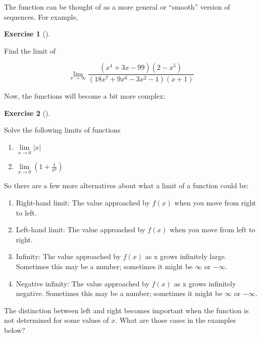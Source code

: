 \documentclass[
  letterpaper,
]{book}
\providecommand{\tightlist}{%
  \setlength{\itemsep}{0pt}\setlength{\parskip}{0pt}}\usepackage{longtable,booktabs,array}
\theoremstyle{definition}
\theoremstyle{definition}
\theoremstyle{plain}
\theoremstyle{definition}
\newtheorem{exercise}{Exercise}[chapter]
\theoremstyle{plain}
\theoremstyle{plain}
\theoremstyle{remark}
\begin{document}
The function can be thought of as a more general or ``smooth'' version
of sequences. For example,

\leavevmode{}%
\begin{exercise}[]\label{exr-limfunmax}

Find the limit of

\[\lim_{x\to\infty} \frac{(x^4 +3x−99)(2−x^5)}{(18x^7 +9x^6 −3x^2 −1)(x+1)}\]

\end{exercise}

Now, the functions will become a bit more complex:

\leavevmode{}%
\begin{exercise}[]\label{exr-discontlim}

Solve the following limits of functions

\begin{enumerate}
\def\labelenumi{\arabic{enumi}.}
\tightlist
\item
  \(\lim\limits_{x\to 0} |x|\)
\item
  \(\lim\limits_{x\to 0} \left(1+\frac{1}{x^2}\right)\)
\end{enumerate}

\end{exercise}

So there are a few more alternatives about what a limit of a function
could be:

\begin{enumerate}
\def\labelenumi{\arabic{enumi}.}
\tightlist
\item
  Right-hand limit: The value approached by \(f(x)\) when you move from
  right to left.
\item
  Left-hand limit: The value approached by \(f(x)\) when you move from
  left to right.
\item
  Infinity: The value approached by \(f(x)\) as x grows infinitely
  large. Sometimes this may be a number; sometimes it might be
  \(\infty\) or \(-\infty\).
\item
  Negative infinity: The value approached by \(f(x)\) as x grows
  infinitely negative. Sometimes this may be a number; sometimes it
  might be \(\infty\) or \(-\infty\).
\end{enumerate}

The distinction between left and right becomes important when the
function is not determined for some values of \(x\). What are those
cases in the examples below?
\end{document}
